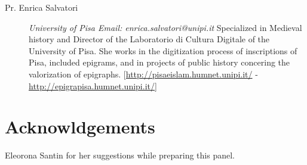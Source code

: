 \documentclass[amsthm,ebook]{saparticle}
\begin{document}
\begin{description}
\item[Pr. Enrica Salvatori] \emph{University of Pisa
Email: enrica.salvatori@unipi.it} Specialized in Medieval history and Director of the Laboratorio di Cultura Digitale of the University of Pisa. She works in the digitization process of inscriptions of Pisa, included epigrams, and in projects of public history concering the valorization of epigraphs.
[\url{http://pisaeislam.humnet.unipi.it/} - \url{http://epigrapisa.humnet.unipi.it/}]





\end{description}


\section*{Acknowldgements}
Eleorona Santin for her suggestions while preparing this panel.
\end{document}
